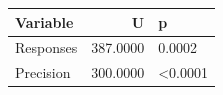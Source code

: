\begin{tabular}{lrl}
\toprule
Variable & U & p \\
\midrule
Responses & 387.0000 & 0.0002 \\
Precision & 300.0000 & <0.0001 \\
\bottomrule
\end{tabular}
